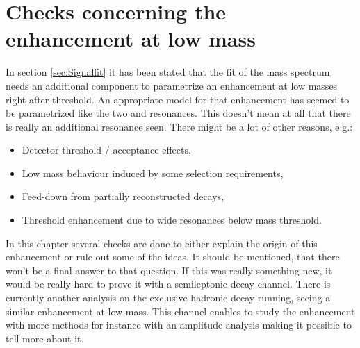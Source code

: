 \section{Checks concerning the enhancement at low \Dz\proton mass}
\label{sec:Structure}

In section \ref{sec:Signalfit} it has been stated that the fit of the \Dz\proton mass spectrum needs an additional component to parametrize an enhancement at low \Dz\proton masses right after threshold.
An appropriate model for that enhancement has seemed to be parametrized like the two \LcResI and \LcResII resonances.
This doesn't mean at all that there is really an additional resonance seen.
There might be a lot of other reasons, e.g.:
\begin{itemize}
    \item Detector threshold / acceptance effects,
    \item Low mass behaviour induced by some selection requirements,
    \item Feed-down from partially reconstructed decays,
    \item Threshold enhancement due to wide resonances below \Dz\proton mass threshold.
\end{itemize}
In this chapter several checks are done to either explain the origin of this enhancement or rule out some of the ideas.
It should be mentioned, that there won't be a final answer to that question.
If this was really something new, it would be really hard to prove it with a semileptonic decay channel.
There is currently another \lhcb analysis on the exclusive hadronic decay \decay{\Lb}{\Dz\proton\pim} running, seeing a similar enhancement at low \Dz\proton mass.
This channel enables to study the enhancement with more methods for instance with an amplitude analysis making it possible to tell more about it.

